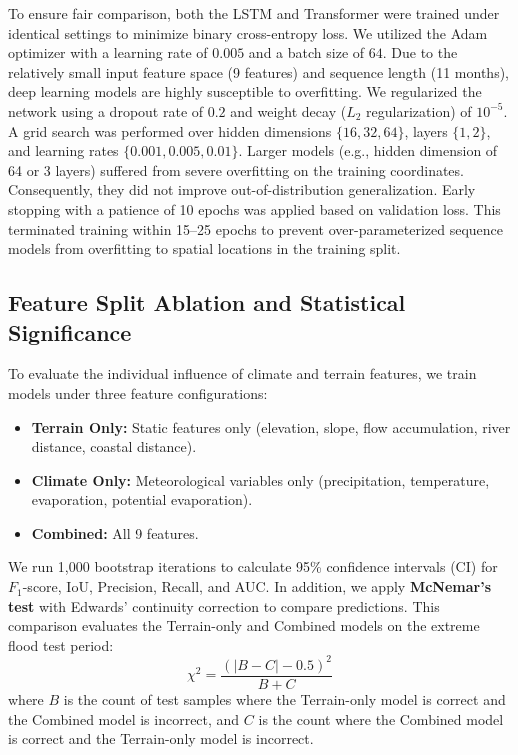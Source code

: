 \documentclass[12pt, a4paper]{article}
\begin{document}
To ensure fair comparison, both the LSTM and Transformer were trained under identical settings to minimize binary cross-entropy loss. We utilized the Adam optimizer with a learning rate of $0.005$ and a batch size of $64$. Due to the relatively small input feature space (9 features) and sequence length (11 months), deep learning models are highly susceptible to overfitting. We regularized the network using a dropout rate of $0.2$ and weight decay ($L_2$ regularization) of $10^{-5}$. A grid search was performed over hidden dimensions $\{16, 32, 64\}$, layers $\{1, 2\}$, and learning rates $\{0.001, 0.005, 0.01\}$. Larger models (e.g., hidden dimension of 64 or 3 layers) suffered from severe overfitting on the training coordinates. Consequently, they did not improve out-of-distribution generalization. Early stopping with a patience of 10 epochs was applied based on validation loss. This terminated training within 15--25 epochs to prevent over-parameterized sequence models from overfitting to spatial locations in the training split.

\subsection{Feature Split Ablation and Statistical Significance}
To evaluate the individual influence of climate and terrain features, we train models under three feature configurations:
\begin{itemize}
    \item \textbf{Terrain Only:} Static features only (elevation, slope, flow accumulation, river distance, coastal distance).
    \item \textbf{Climate Only:} Meteorological variables only (precipitation, temperature, evaporation, potential evaporation).
    \item \textbf{Combined:} All 9 features.
\end{itemize}

We run 1,000 bootstrap iterations to calculate 95\% confidence intervals (CI) for $F_1$-score, IoU, Precision, Recall, and AUC. In addition, we apply \textbf{McNemar's test} with Edwards' continuity correction to compare predictions. This comparison evaluates the Terrain-only and Combined models on the extreme flood test period:
\begin{equation}
    \chi^2 = \frac{(|B - C| - 0.5)^2}{B + C}
\end{equation}
where $B$ is the count of test samples where the Terrain-only model is correct and the Combined model is incorrect, and $C$ is the count where the Combined model is correct and the Terrain-only model is incorrect.
\end{document}
